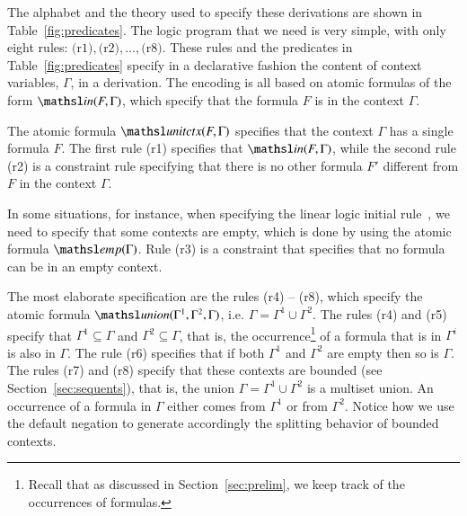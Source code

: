\documentclass{new_tlp}
\newcommand{\elin}[2]{\ensuremath{{\tsl{unitctx}(\ensuremath{#1}, \ensuremath{#2})}}}
\newcommand{\emp}[1]{\ensuremath{{\tsl{emp}(\ensuremath{#1})}}}
\newcommand{\union}[3]{\ensuremath{{\tsl{union}(\ensuremath{#1},\ensuremath{#2},\ensuremath{ #3})}}}
\newcommand{\In}[2]{\ensuremath{\tsl{in}(\ensuremath{#1},\ensuremath{#2})}}
\begin{document}
The alphabet and the theory used to specify these derivations are shown in Table~\ref{fig:predicates}. 
The logic program that we need is very simple, 
with only eight rules: $\textrm{(r1)}, \textrm{(r2)},\ldots, \textrm{(r8)}$. These
rules and the predicates in Table~\ref{fig:predicates} specify in a declarative 
fashion the content of context variables, $\Gamma$, in a derivation.
The encoding is all based on atomic formulas of the form $\In{F}{\Gamma}$, which 
specify that the formula $F$ is in the context $\Gamma$. 

The atomic formula $\elin{F}{\Gamma}$ specifies that the context $\Gamma$ has a
single formula $F$. 
The first rule (r1) specifies that $\In{F}{\Gamma}$, while the second rule (r2) is a constraint
rule specifying that there is no other formula $F'$ different from $F$ in the context $\Gamma$.

In some situations, for instance, when specifying the linear logic initial rule~\cite{girard87tcs}, 
we need to specify that some contexts are empty, which is done by using the atomic formula $\emp{\Gamma}$.  
Rule (r3) is a constraint that specifies that no formula can be in an empty context.

The most elaborate specification are the rules (r4) -- (r8), which specify the atomic formula 
$\union{\Gamma^1} {\Gamma^2} {\Gamma}$, i.e. $\Gamma = \Gamma^1 \cup \Gamma^2$.
The rules (r4) and (r5) specify that $\Gamma^1 \subseteq \Gamma$ and $\Gamma^2 \subseteq \Gamma$, 
that is, the occurrence\footnote{Recall that as discussed in Section~\ref{sec:prelim}, 
we keep track of the occurrences of formulas.} of a formula that is in $\Gamma^i$ is also in $\Gamma$. The rule (r6) specifies that 
if both $\Gamma^1$ and $\Gamma^2$ are empty then so is $\Gamma$. 
The rules (r7) and (r8) 
specify that these contexts are bounded (see Section~\ref{sec:sequents}), that is, the union 
$\Gamma = \Gamma^1 \cup \Gamma^2$ is a multiset union. An occurrence of a formula in $\Gamma$ either comes
from $\Gamma^1$ or from $\Gamma^2$. Notice how we use the default negation to generate accordingly
the splitting behavior of bounded contexts. 
\end{document}
